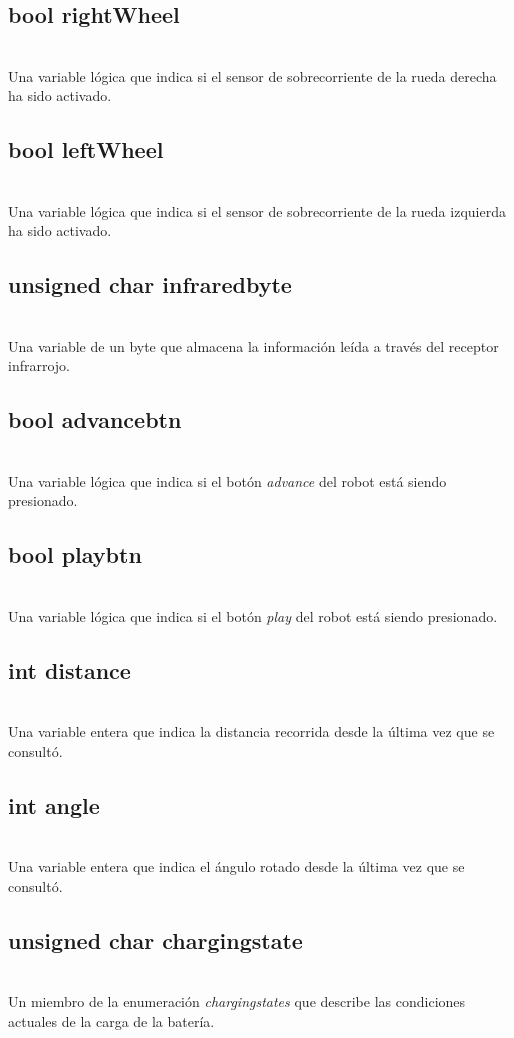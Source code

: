 \documentclass[letterpaper]{book}
\begin{document}
\subsection{bool rightWheel}\mbox{}\\
Una variable lógica que indica si el sensor de sobrecorriente de la rueda derecha ha sido activado.
\subsection{bool leftWheel}\mbox{}\\
Una variable lógica que indica si el sensor de sobrecorriente de la rueda izquierda ha sido activado.
\subsection{unsigned char infraredbyte}\mbox{}\\
Una variable de un byte que almacena la información leída a través del receptor infrarrojo.
\subsection{bool advancebtn}\mbox{}\\
Una variable lógica que indica si el botón \emph{advance} del robot está siendo presionado.
\subsection{bool playbtn}\mbox{}\\
Una variable lógica que indica si el botón \emph{play} del robot está siendo presionado.
\subsection{int distance}\mbox{}\\
Una variable entera que indica la distancia recorrida desde la última vez que se consultó.
\subsection{int angle}\mbox{}\\
Una variable entera que indica el ángulo rotado desde la última vez que se consultó.
\subsection{unsigned char chargingstate}\mbox{}\\
Un miembro de la enumeración \emph{chargingstates} que describe las condiciones actuales de la carga de la batería.
\end{document}
